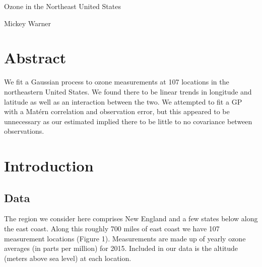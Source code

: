 \documentclass[12pt]{article}
\begin{document}
\begin{center}
\begin{huge}
Ozone in the Northeast United States
\end{huge}
\bigskip

Mickey Warner
\end{center}

\section{Abstract}

We fit a Gaussian process to ozone measurements at 107 locations in the northeastern United States. We found there to be linear trends in longitude and latitude as well as an interaction between the two. We attempted to fit a GP with a Mat{\'e}rn correlation and observation error, but this appeared to be unnecessary as our estimated implied there to be little to no covariance between observations.

\section{Introduction}

\subsection{Data}

The region we consider here comprises New England and a few states below along the east coast. Along this roughly 700 miles of east coast we have 107 measurement locations (Figure 1). Measurements are made up of yearly ozone averages (in parts per million) for 2015. Included in our data is the altitude (meters above sea level) at each location.
\end{document}
